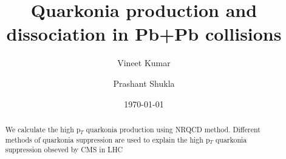 \documentclass[aps,prc,preprint,superscriptaddress,showpacs,showkeys,amsmath]{revtex4-1}
\begin{document}
\newcommand{\Jpsi}{J/\psi}
\newcommand{\pT}{p_{T}}
\newcommand{\calO}{{\cal{O}}}
\newcommand{\barQ}{{\bar{Q}}}
\newcommand{\barq}{{\bar{q}}}
\newcommand{\barc}{{\bar{c}}}
\newcommand{\barb}{{\bar{b}}}
\newcommand{\baru}{\bar{u}}
\newcommand{\barv}{\bar{v}}
\newcommand{\barup}{\bar{u}_{+}}
\newcommand{\barum}{\bar{u}_{-}}
\newcommand{\barvp}{\bar{v}_{+}}
\newcommand{\barvm}{\bar{v}_{-}}
\newcommand{\charm}{{\rm{charm}}}
\newcommand{\bottom}{{\rm{bottom}}}

\newcommand{\cs}{{\hat{s}}}
\newcommand{\ct}{{\hat{t}}}
\newcommand{\cu}{{\hat{u}}}
\newcommand{\alphas}{{\alpha_{s}}}


\newcommand{\shat}{\hat{\rm s}}
\newcommand{\that}{\hat{\rm t}}
\newcommand{\uhat}{\hat{\rm u}}
\newcommand{\zhat}{\hat{\rm z}}

\newcommand{\CA}{{\cal A}}
\newcommand{\Qbar}{{\overline Q}}
\newcommand{\QQbaroctetgen}{{Q\Qbar[ ^{2S+1}L_J^{(8)}]}}
\newcommand{\QQbaroctetsingS}{{Q\Qbar[ ^1S_0^{(8)}]}}
\newcommand{\QQbaroctettripP}{{Q\Qbar[ ^3P_J^{(8)}]}}
\newcommand{\QQbaroctettripPone}{{Q\Qbar[ ^3P_1^{(8)}]}}

\def\QQbaroctettripS{Q\Qbar[ ^3S_1^{(8)}]}
\def\QQbaroctetPzero{Q\Qbar[ ^3P_0^{(8)}]}
\def\QQbaroctetPone{Q\Qbar[ ^3P_1^{(8)}]}
\def\QQbaroctetPtwo{Q\Qbar[ ^3P_2^{(8)}]}



\title{{\Large Quarkonia production and dissociation in Pb+Pb collisions}} 
\author{\large Vineet Kumar}
\author{\large Prashant Shukla}

\date{\today}

\begin{abstract}
  We calculate the high p$_{T}$ quarkonia production using NRQCD method.
  Different methods of quarkonia suppression are used to explain the high
  p$_{T}$ quarkonia suppression obseved by CMS in LHC
\end{abstract}

\end{document}
